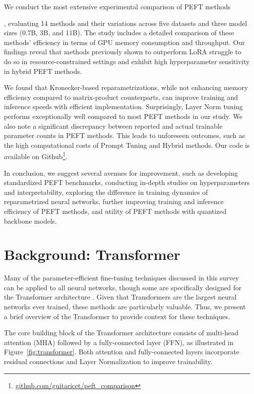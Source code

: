 We conduct the most extensive experimental comparison of PEFT methods 

, evaluating 14 methods and their variations across five datasets and three model sizes (0.7B, 3B, and 11B). The study includes a detailed comparison of these methods' efficiency in terms of GPU memory consumption and throughput. Our findings reveal that methods previously shown to outperform LoRA struggle to do so in resource-constrained settings and exhibit high hyperparameter sensitivity in hybrid PEFT methods. 

We found that Kronecker-based reparametrizations, while not enhancing memory efficiency compared to matrix-product counterparts, can improve training and inference speeds with efficient implementation. Surprisingly, Layer Norm tuning performs exceptionally well compared to most PEFT methods in our study. We also note a significant discrepancy between reported and actual trainable parameter counts in PEFT methods. This leads to unforeseen outcomes, such as the high computational costs of Prompt Tuning and Hybrid methods. Our code is available on Github\footnote{\href{http://github.com/guitaricet/peft_comparison}{github.com/guitaricet/peft\_comparison}}.

In conclusion, we suggest several avenues for improvement, such as developing standardized PEFT benchmarks, conducting in-depth studies on hyperparameters and interpretability, exploring the difference in training dynamics of reparametrized neural networks, further improving training and inference efficiency of PEFT methods, and utility of PEFT methods with quantized backbone models.

\section{Background: Transformer}

Many of the parameter-efficient fine-tuning techniques discussed in this survey can be applied to all neural networks, though some are specifically designed for the Transformer architecture \citep{vaswani2017attention}. Given that Transformers are the largest neural networks ever trained, these methods are particularly valuable. Thus, we present a brief overview of the Transformer to provide context for these techniques.

The core building block of the Transformer architecture consists of multi-head attention (MHA) followed by a fully-connected layer (FFN), as illustrated in Figure~\ref{fig:transformer}. Both attention and fully-connected layers incorporate residual connections \citep{resnet} and Layer Normalization \citep{layer_norm} to improve trainability.


